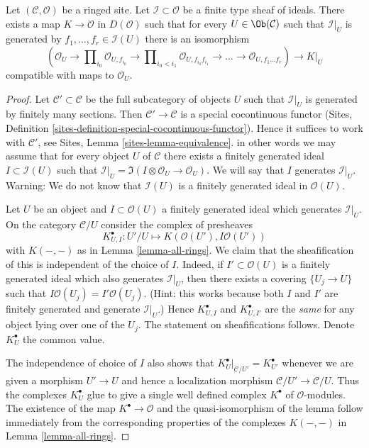 \begin{lemma}
\label{lemma-global-extended-cech-complex}
Let $(\mathcal{C}, \mathcal{O})$ be a ringed site. Let
$\mathcal{I} \subset \mathcal{O}$ be a finite type sheaf of ideals.
There exists a map $K \to \mathcal{O}$ in $D(\mathcal{O})$
such that for every $U \in \Ob(\mathcal{C})$ such that
$\mathcal{I}|_U$ is generated by $f_1, \ldots, f_r \in \mathcal{I}(U)$
there is an isomorphism
$$
(\mathcal{O}_U \to \prod\nolimits_{i_0} \mathcal{O}_{U, f_{i_0}} \to
\prod\nolimits_{i_0 < i_1} \mathcal{O}_{U, f_{i_0}f_{i_1}} \to
\ldots \to \mathcal{O}_{U, f_1\ldots f_r}) \longrightarrow K|_U
$$
compatible with maps to $\mathcal{O}_U$.
\end{lemma}

\begin{proof}
Let $\mathcal{C}' \subset \mathcal{C}$ be the full subcategory
of objects $U$ such that $\mathcal{I}|_U$ is generated by
finitely many sections. Then $\mathcal{C}' \to \mathcal{C}$
is a special cocontinuous functor
(Sites, Definition \ref{sites-definition-special-cocontinuous-functor}).
Hence it suffices to work with $\mathcal{C}'$, see
Sites, Lemma \ref{sites-lemma-equivalence}.
in other words we may assume that for every
object $U$ of $\mathcal{C}$ there exists a finitely generated
ideal $I \subset \mathcal{I}(U)$ such that
$\mathcal{I}|_U = \Im(I \otimes \mathcal{O}_U \to \mathcal{O}_U)$.
We will say that $I$ generates $\mathcal{I}|_U$.
Warning: We do not know that $\mathcal{I}(U)$ is a finitely generated
ideal in $\mathcal{O}(U)$.

\medskip\noindent
Let $U$ be an object and $I \subset \mathcal{O}(U)$ a finitely
generated ideal which generates $\mathcal{I}|_U$.
On the category $\mathcal{C}/U$ consider the complex of presheaves
$$
K_{U, I}^\bullet : U'/U \longmapsto K(\mathcal{O}(U'), I\mathcal{O}(U'))
$$
with $K(-, -)$ as in Lemma \ref{lemma-all-rings}.
We claim that the sheafification of this is independent of
the choice of $I$. Indeed, if $I' \subset \mathcal{O}(U)$
is a finitely generated ideal which also generates $\mathcal{I}|_U$, then
there exists a covering $\{U_j \to U\}$ such that
$I\mathcal{O}(U_j) = I'\mathcal{O}(U_j)$. (Hint: this works because
both $I$ and $I'$ are finitely generated and generate $\mathcal{I}|_U$.)
Hence $K_{U, I}^\bullet$ and $K_{U, I'}^\bullet$ are the {\it same}
for any object lying over one of the $U_j$. The statement
on sheafifications follows. Denote $K_U^\bullet$ the common value.

\medskip\noindent
The independence of choice of $I$ also shows that
$K_U^\bullet|_{\mathcal{C}/U'} = K_{U'}^\bullet$
whenever we are given a morphism
$U' \to U$ and hence a localization morphism
$\mathcal{C}/U' \to \mathcal{C}/U$. Thus the complexes
$K_U^\bullet$ glue to give a single well defined complex $K^\bullet$
of $\mathcal{O}$-modules. The existence of the map $K^\bullet \to \mathcal{O}$
and the quasi-isomorphism of the lemma follow immediately from
the corresponding properties of the complexes $K(-, -)$ in
Lemma \ref{lemma-all-rings}.
\end{proof}

